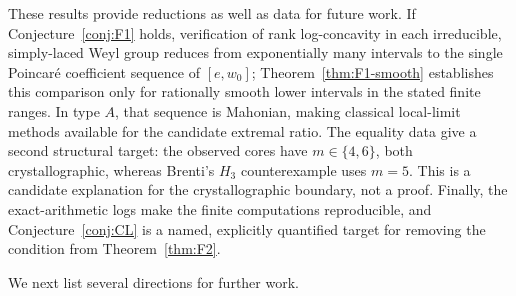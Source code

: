 \documentclass[11pt]{amsart}
\theoremstyle{plain}
\theoremstyle{definition}
\theoremstyle{remark}
\begin{document}
These results provide reductions as well as data for future work. If
Conjecture~\ref{conj:F1} holds, verification of rank log-concavity in each
irreducible, simply-laced Weyl group reduces from exponentially many
intervals to the single Poincar\'e coefficient sequence of $[e,w_0]$;
Theorem~\ref{thm:F1-smooth} establishes this comparison only for
rationally smooth lower intervals in the stated finite ranges. In type
$A$, that sequence is Mahonian, making classical local-limit methods
available for the candidate extremal ratio. The equality data give a
second structural target: the observed cores have
$m\in\{4,6\}$, both crystallographic, whereas Brenti's $H_3$
counterexample uses $m=5$. This is a candidate explanation for the
crystallographic boundary, not a proof. Finally, the exact-arithmetic logs
make the finite computations reproducible, and
Conjecture~\ref{conj:CL} is a named, explicitly quantified target for
removing the condition from Theorem~\ref{thm:F2}.

We next list several directions for further work.
\end{document}
